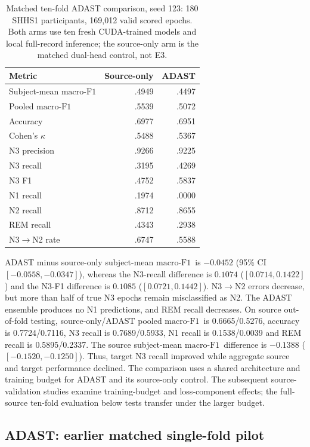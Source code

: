 \documentclass[10pt,a4paper]{article}
\newcommand{\mf}{\ensuremath{\mathrm{macro\text{-}F1}}}
\newcommand{\ci}{95\% CI}
\begin{document}
\begin{table}[H]
\centering\small
\caption{Matched ten-fold ADAST comparison, seed 123: 180 SHHS1 participants,
169,012 valid scored epochs. Both arms use ten fresh CUDA-trained models and local
full-record inference; the source-only arm is the matched dual-head control, not E3.}
\label{tab:sup_adast_intervention}
\begin{tabular}{lrr}
\toprule
Metric & Source-only & ADAST \\
\midrule
Subject-mean \mf & .4949 & .4497 \\
Pooled \mf & .5539 & .5072 \\
Accuracy & .6977 & .6951 \\
Cohen's $\kappa$ & .5488 & .5367 \\
N3 precision & .9266 & .9225 \\
N3 recall & .3195 & .4269 \\
N3 F1 & .4752 & .5837 \\
N1 recall & .1974 & .0000 \\
N2 recall & .8712 & .8655 \\
REM recall & .4343 & .2938 \\
N3$\rightarrow$N2 rate & .6747 & .5588 \\
\bottomrule
\end{tabular}
\end{table}

ADAST minus source-only subject-mean \mf\ is $-0.0452$ (\ci\ $[-0.0558,-0.0347]$),
whereas the N3-recall difference is $0.1074$ ($[0.0714,0.1422]$) and the N3-F1
difference is $0.1085$ ($[0.0721,0.1442]$). N3$\rightarrow$N2 errors decrease,
but more than half of true N3 epochs remain misclassified as N2. The ADAST ensemble
produces no N1 predictions, and REM recall decreases. On source out-of-fold testing,
source-only/ADAST pooled \mf\ is 0.6665/0.5276, accuracy is 0.7724/0.7116,
N3 recall is 0.7689/0.5933, N1 recall is 0.1538/0.0039 and REM recall is
0.5895/0.2337. The source subject-mean \mf\ difference is $-0.1388$
($[-0.1520,-0.1250]$). Thus, target N3 recall improved while aggregate source and target
performance declined. The comparison uses a shared architecture and training budget for
ADAST and its source-only control. The subsequent source-validation studies examine
training-budget and loss-component effects; the full-source ten-fold evaluation below
tests transfer under the larger budget.

\subsection*{ADAST: earlier matched single-fold pilot}
\end{document}
